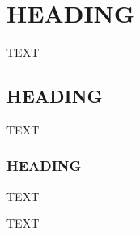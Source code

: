 \documentclass[gmd, manuscript]{copernicus}
\begin{document}
\section{HEADING}
TEXT


\subsection{HEADING}
TEXT


\subsubsection{HEADING}
TEXT


\conclusions  %
TEXT












\appendix
\section{}    %

\subsection{}     %


\noappendix       %

\end{document}
